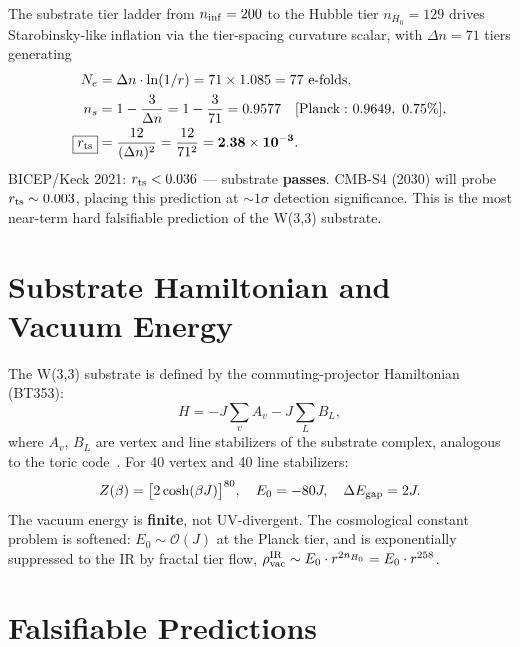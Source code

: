 \documentclass[aps,prl,twocolumn,superscriptaddress,nofootinbib]{revtex4-2}
\begin{document}
The substrate tier ladder from $n_{\rm inf}=200$ to the Hubble tier
$n_{H_0}=129$ drives Starobinsky-like inflation via the
tier-spacing curvature scalar, with
$\Delta n = 71$ tiers generating
\begin{align}
N_e &= \Delta n \cdot \ln(1/r) = 71\times1.085 = 77\ {\rm e\text{-}folds}, \\
n_s &= 1 - \frac{3}{\Delta n} = 1 - \frac{3}{71} = 0.9577
  \quad [{\rm Planck:}\ 0.9649,\ 0.75\%], \\
\boxed{r_{\rm ts}} &= \frac{12}{(\Delta n)^2} = \frac{12}{71^2}
  = \mathbf{2.38\times10^{-3}}. \label{eq:rts}
\end{align}
BICEP/Keck 2021: $r_{\rm ts}<0.036$ --- substrate \textbf{passes}.
CMB-S4 (2030) will probe $r_{\rm ts}\sim0.003$, placing this prediction
at $\sim1\sigma$ detection significance. This is the most near-term hard
falsifiable prediction of the W(3,3) substrate.

\section{Substrate Hamiltonian and Vacuum Energy}

The W(3,3) substrate is defined by the commuting-projector Hamiltonian
(BT353):
\begin{equation}
H = -J\sum_v A_v - J\sum_L B_L,
\end{equation}
where $A_v$, $B_L$ are vertex and line stabilizers of the substrate complex,
analogous to the toric code~\cite{Kitaev2003}.
For 40 vertex and 40 line stabilizers:
\begin{equation}
Z(\beta) = \bigl[2\cosh(\beta J)\bigr]^{80}, \quad
E_0 = -80J, \quad \Delta E_{\rm gap} = 2J.
\end{equation}
The vacuum energy is \textbf{finite}, not UV-divergent. The cosmological
constant problem is softened: $E_0\sim\mathcal{O}(J)$ at the Planck tier,
and is exponentially suppressed to the IR by fractal tier flow,
$\rho_{\rm vac}^{\rm IR}\sim E_0\cdot r^{2n_{H_0}}=E_0\cdot r^{258}$.

\section{Falsifiable Predictions}
\end{document}
